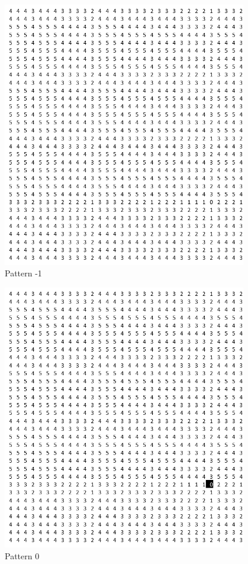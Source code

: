\documentclass[oneside,12pt]{DISCSthesis}
\begin{document}
		\begin{figure}[h]\label{fig:block_patterns}
			\footnotesize\centering
			\begin{minipage}{.135\textwidth}\centering\includegraphics[width=0.95\textwidth]{img/-1}\\ Pattern -1 \end{minipage} 
			\begin{minipage}{.135\textwidth}\centering\includegraphics[width=0.95\textwidth]{img/0}\\ Pattern 0 \end{minipage} 

\end{figure}
\end{document}
